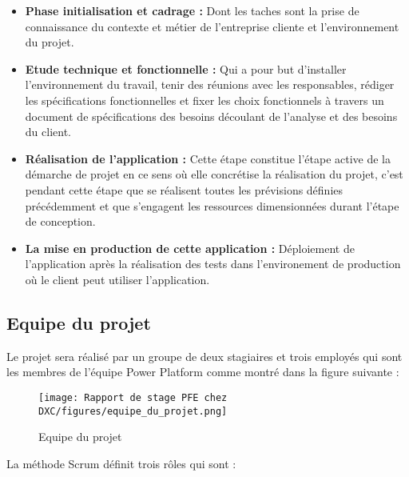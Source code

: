 \begin{itemize}
  \item \textbf{Phase initialisation et cadrage :}
        Dont les taches sont la prise de connaissance du contexte et métier de
        l’entreprise cliente et l’environnement du projet.
    \\
    \item \textbf{Etude technique et fonctionnelle :} 
        Qui a pour but d’installer l’environnement du travail, tenir des réunions avec les responsables, rédiger les spécifications fonctionnelles et fixer les choix fonctionnels à travers un document de spécifications des besoins découlant de l’analyse et des besoins du client.
    \\    
    \item \textbf{Réalisation de l’application :} 
        Cette étape constitue l'étape active de la démarche de projet en ce sens où
        elle concrétise la réalisation du projet, c'est pendant cette étape que se réalisent toutes les prévisions définies précédemment et que s'engagent les ressources dimensionnées durant l'étape de conception.
    \\    
    \item \textbf{La mise en production de cette application :} 
        Déploiement de l’application après la réalisation des tests dans l'environement de production où le client peut utiliser l’application.
    \\    

\end{itemize}

\newpage
\subsection{Equipe du projet}
Le projet sera réalisé par un groupe de deux stagiaires et trois employés qui sont les membres de l'équipe Power Platform comme montré dans la figure suivante :
\\

\begin{figure}[!h]
    \centering
    \texttt{[image: Rapport de stage PFE chez DXC/figures/equipe\_du\_projet.png]}
    \caption{Equipe du projet}
\end{figure}

La méthode Scrum définit trois rôles qui sont :
\\

